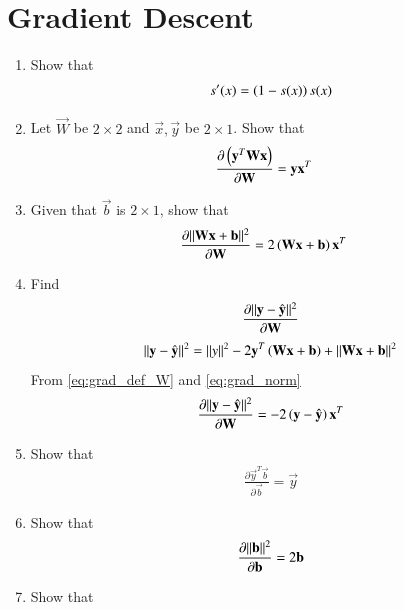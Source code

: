 \documentclass[journal,12pt,twocolumn]{IEEEtran}
\renewcommand\thesection{\arabic{section}}
\begin{document}
\section{Gradient Descent}
\begin{enumerate}[label=\thesection.\arabic*
,ref=\thesection.\theenumi]
\item Show that 
\begin{align}
\label{eq:sig_der}
s^{\prime}(x)=\left(1-s(x)\right)s(x)
\end{align}
\item Let $\vec{W}$ be $2\times 2$ and $\vec{x},\vec{y}$ be $2\times 1$.  Show that 
\begin{align}
\label{eq:grad_def_W}
\frac{\partial \left(\mathbf{y}^T\mathbf{W}\mathbf{x}\right)} {\partial\mathbf{W}} &= \mathbf{y}\mathbf{x}^T
\end{align}
\item Given that $\vec{b}$ is $2\times 1$, show that 
\begin{align}
\label{eq:grad_norm}
\frac{\partial \lVert\mathbf{W}\mathbf{x}+\mathbf{b}\rVert^2 }{\partial\mathbf{W}} &= 2\left(\mathbf{W}\mathbf{x}+\mathbf{b}\right)\mathbf{x}^T
\end{align}
\item Find
\begin{align}
\frac{\partial \lVert\mathbf{y}-\hat{\mathbf{y}}\rVert^2} {\partial\mathbf{W}} 
\end{align}
\solution
\begin{align}
\norm{\vec{y}-\hat{\vec{y}}}^2 = \norm{y}^2 - 2\vec{y}^T\brak{\vec{W}\vec{x}+\vec{b}}+ \norm{\mbf{W}\mbf{x}+\vec{b}}^2 %
\end{align}
%
From \eqref{eq:grad_def_W} and \eqref{eq:grad_norm}
\begin{align}
\frac{\partial \lVert\mathbf{y}-\hat{\mathbf{y}}\rVert^2} {\partial\mathbf{W}}  = - 2\left(\mathbf{y}-\hat{\mathbf{y}}\right)\mathbf{x}^T
\end{align}
\item Show that
\begin{align}
\frac{\partial \vec{y}^T\vec{b}} {\partial\vec{b}}  = \vec{y}
\end{align}
\item Show that
\begin{align}
\frac{\partial \lVert\mathbf{b}\rVert^2} {\partial\mathbf{b}}  = 2\mathbf{b}
\end{align}
\item Show that 
\begin{align}

\end{align}
\end{enumerate}
\end{document}
